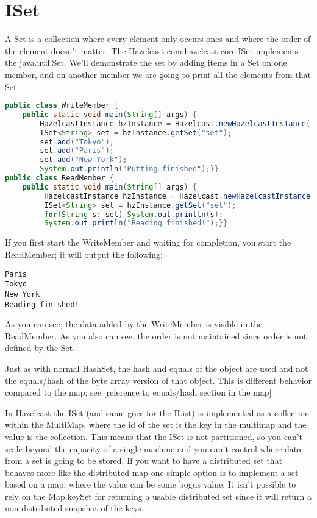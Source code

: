 \section{ISet}
A Set is a collection where every element only occurs ones and where the order of the element doesn't matter. The Hazelcast com.hazelcast.core.ISet implements the java.util.Set. We'll demonstrate the set by adding items in a Set on one member, and on another member we are going to print all the elements from that Set:
\begin{lstlisting}[language=java]
public class WriteMember {
    public static void main(String[] args) {
        HazelcastInstance hzInstance = Hazelcast.newHazelcastInstance();
        ISet<String> set = hzInstance.getSet("set");
        set.add("Tokyo");
        set.add("Paris");
        set.add("New York");
        System.out.println("Putting finished");}}
public class ReadMember {
    public static void main(String[] args) {
         HazelcastInstance hzInstance = Hazelcast.newHazelcastInstance();
         ISet<String> set = hzInstance.getSet("set");
         for(String s: set) System.out.println(s);
         System.out.println("Reading finished!");}}
\end{lstlisting}
If you first start the WriteMember and waiting for completion, you start the ReadMember; it will output the following:
\begin{lstlisting}
Paris
Tokyo
New York
Reading finished!	
\end{lstlisting}
As you can see, the data added by the WriteMember is visible in the ReadMember. As you also can see, the order is not maintained since order is not defined by the Set.

Just as with normal HashSet, the hash and equals of the object are used and not the equals/hash of the byte array version of that object. This is different behavior compared to the map; see [reference to equals/hash section in the map]

In Hazelcast the ISet (and same goes for the IList) is implemented as a collection within the MultiMap, where the id of the set is the key in the multimap and the value is the collection. This means that the ISet is not partitioned, so you can't scale beyond the capacity of a single machine and you can't control where data from a set is going to be stored. If you want to have a distributed set that behaves more like the distributed map one simple option is to implement a set based on a map, where the value can be some bogus value. It isn't possible to rely on the Map.keySet for returning  a usable distributed set since it will return a non distributed snapshot of the keys.

